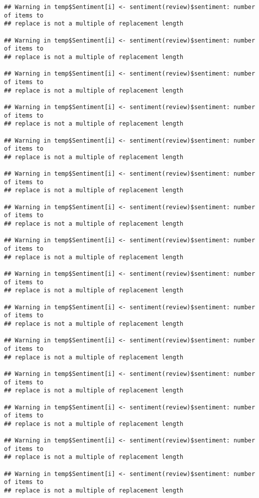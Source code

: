 \documentclass[
]{article}
\begin{document}
\begin{verbatim}
## Warning in temp$Sentiment[i] <- sentiment(review)$sentiment: number of items to
## replace is not a multiple of replacement length

## Warning in temp$Sentiment[i] <- sentiment(review)$sentiment: number of items to
## replace is not a multiple of replacement length

## Warning in temp$Sentiment[i] <- sentiment(review)$sentiment: number of items to
## replace is not a multiple of replacement length

## Warning in temp$Sentiment[i] <- sentiment(review)$sentiment: number of items to
## replace is not a multiple of replacement length

## Warning in temp$Sentiment[i] <- sentiment(review)$sentiment: number of items to
## replace is not a multiple of replacement length

## Warning in temp$Sentiment[i] <- sentiment(review)$sentiment: number of items to
## replace is not a multiple of replacement length

## Warning in temp$Sentiment[i] <- sentiment(review)$sentiment: number of items to
## replace is not a multiple of replacement length

## Warning in temp$Sentiment[i] <- sentiment(review)$sentiment: number of items to
## replace is not a multiple of replacement length

## Warning in temp$Sentiment[i] <- sentiment(review)$sentiment: number of items to
## replace is not a multiple of replacement length

## Warning in temp$Sentiment[i] <- sentiment(review)$sentiment: number of items to
## replace is not a multiple of replacement length

## Warning in temp$Sentiment[i] <- sentiment(review)$sentiment: number of items to
## replace is not a multiple of replacement length

## Warning in temp$Sentiment[i] <- sentiment(review)$sentiment: number of items to
## replace is not a multiple of replacement length

## Warning in temp$Sentiment[i] <- sentiment(review)$sentiment: number of items to
## replace is not a multiple of replacement length

## Warning in temp$Sentiment[i] <- sentiment(review)$sentiment: number of items to
## replace is not a multiple of replacement length

## Warning in temp$Sentiment[i] <- sentiment(review)$sentiment: number of items to
## replace is not a multiple of replacement length


\end{verbatim}
\end{document}
